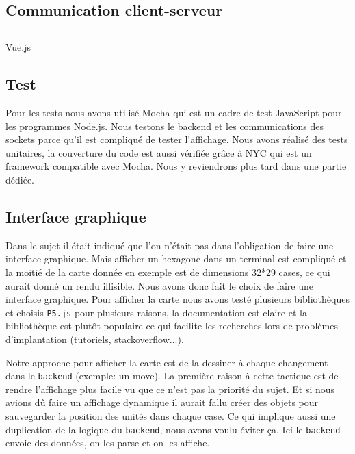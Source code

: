 \subsection{Communication client-serveur}



\subsection{}

Vue.js

\subsection{Test}

Pour les tests nous avons utilisé Mocha qui est un cadre de test JavaScript pour les programmes Node.js. Nous testons le backend et les communications des sockets parce qu'il est compliqué de tester l'affichage. Nous avons réalisé des tests unitaires, la couverture du code est aussi vérifiée grâce à NYC qui est un framework compatible avec Mocha. Nous y reviendrons plus tard dans une partie dédiée.

\subsection{Interface graphique}

Dans le sujet il était indiqué que l'on n'était pas dans l'obligation de faire une interface graphique. Mais afficher un hexagone dans un terminal est compliqué et la moitié de la carte donnée en exemple est de dimensions 32*29 cases, ce qui aurait donné un rendu illisible. Nous avons donc fait le choix de faire une interface graphique. Pour afficher la carte nous avons testé plusieurs bibliothèques et choisis \lstinline{P5.js} pour plusieurs raisons, la documentation est claire et la bibliothèque est plutôt populaire ce qui facilite les recherches lors de problèmes d'implantation (tutoriels, stackoverflow...).

Notre approche pour afficher la carte est de la dessiner à chaque changement dans le \lstinline{backend} (exemple: un move). La première raison à cette tactique est de rendre l'affichage plus facile vu que ce n'est pas la priorité du sujet. Et si nous avions dû faire un affichage dynamique il aurait fallu créer des objets pour sauvegarder la position des unités dans chaque case. Ce qui implique aussi une duplication de la logique du \lstinline{backend}, nous avons voulu éviter ça. Ici le \lstinline{backend} envoie des données, on les parse et on les affiche.

